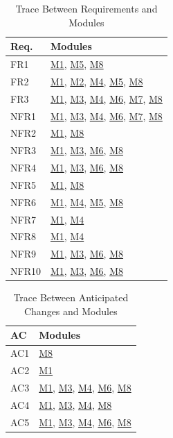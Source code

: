 \documentclass[12pt, titlepage]{article}
\begin{document}
\begin{table}[H]
\centering
\begin{tabular}{p{} p{}}
\toprule
\textbf{Req.} & \textbf{Modules}\\
\midrule
FR1 & \hyperref[m1]{M1}, \hyperref[m5]{M5}, \hyperref[m8]{M8}\\
FR2 & \hyperref[m1]{M1}, \hyperref[m2]{M2}, \hyperref[m4]{M4}, \hyperref[m5]{M5}, \hyperref[m8]{M8}\\
FR3 & \hyperref[m1]{M1}, \hyperref[m3]{M3}, \hyperref[m4]{M4}, \hyperref[m6]{M6}, \hyperref[m7]{M7}, \hyperref[m8]{M8}\\

NFR1 & \hyperref[m1]{M1}, \hyperref[m3]{M3}, \hyperref[m4]{M4}, \hyperref[m6]{M6}, \hyperref[m7]{M7}, \hyperref[m8]{M8}\\
NFR2 & \hyperref[m1]{M1}, \hyperref[m8]{M8}\\
NFR3 & \hyperref[m1]{M1}, \hyperref[m3]{M3}, \hyperref[m6]{M6}, \hyperref[m8]{M8}\\
NFR4 & \hyperref[m1]{M1}, \hyperref[m3]{M3}, \hyperref[m6]{M6}, \hyperref[m8]{M8}\\
NFR5 & \hyperref[m1]{M1}, \hyperref[m8]{M8}\\
NFR6 & \hyperref[m1]{M1}, \hyperref[m4]{M4}, \hyperref[m5]{M5}, \hyperref[m8]{M8}\\
NFR7 & \hyperref[m1]{M1}, \hyperref[m4]{M4}\\
NFR8 & \hyperref[m1]{M1}, \hyperref[m4]{M4}\\
NFR9 & \hyperref[m1]{M1}, \hyperref[m3]{M3}, \hyperref[m6]{M6}, \hyperref[m8]{M8}\\
NFR10 &  \hyperref[m1]{M1}, \hyperref[m3]{M3}, \hyperref[m6]{M6}, \hyperref[m8]{M8}\\

\bottomrule
\end{tabular}
\caption{Trace Between Requirements and Modules}
\label{TblRT}
\end{table}

\begin{table}[H]
\centering
\begin{tabular}{p{} p{}}
\toprule
\textbf{AC} & \textbf{Modules}\\
\midrule
AC1 & \hyperref[m8]{M8}\\
AC2 & \hyperref[m1]{M1}\\
AC3 & \hyperref[m1]{M1}, \hyperref[m3]{M3}, \hyperref[m4]{M4}, \hyperref[m6]{M6}, \hyperref[m8]{M8}\\
AC4 & \hyperref[m1]{M1}, \hyperref[m3]{M3}, \hyperref[m4]{M4}, \hyperref[m8]{M8}\\
AC5 & \hyperref[m1]{M1}, \hyperref[m3]{M3}, \hyperref[m4]{M4}, \hyperref[m6]{M6}, \hyperref[m8]{M8}\\

\bottomrule
\end{tabular}
\caption{Trace Between Anticipated Changes and Modules}
\label{TblACT}
\end{table}
\end{document}
